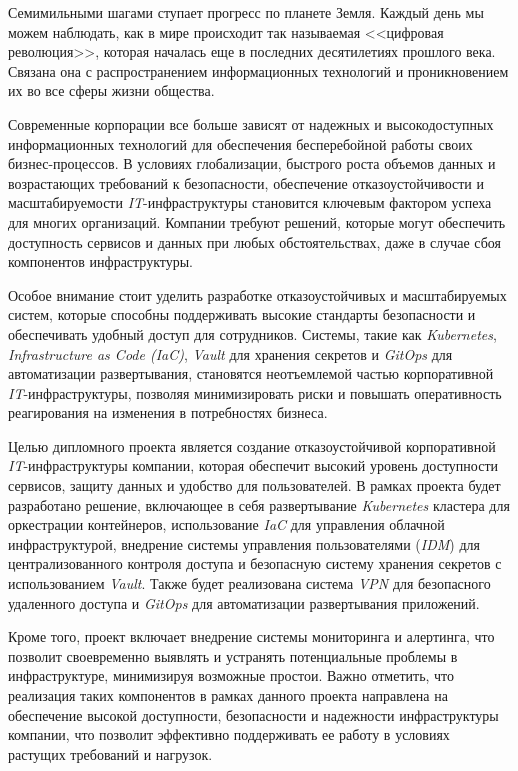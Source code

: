 \label{sec:intro}

Семимильными шагами ступает прогресс по планете Земля. Каждый день мы можем наблюдать, как в мире происходит так называемая <<цифровая революция>>, которая началась еще в последних десятилетиях прошлого века. Связана она с распространением информационных технологий и проникновением их во все сферы жизни общества.

Современные корпорации все больше зависят от надежных и высокодоступных информационных технологий для обеспечения бесперебойной работы своих бизнес-процессов. В условиях глобализации, быстрого роста объемов данных и возрастающих требований к безопасности, обеспечение отказоустойчивости и масштабируемости \textit{IT}-инфраструктуры становится ключевым фактором успеха для многих организаций. Компании требуют решений, которые могут обеспечить доступность сервисов и данных при любых обстоятельствах, даже в случае сбоя компонентов инфраструктуры.

Особое внимание стоит уделить разработке отказоустойчивых и масштабируемых систем, которые способны поддерживать высокие стандарты безопасности и обеспечивать удобный доступ для сотрудников. Системы, такие как \textit{Kubernetes}, \textit{Infrastructure as Code (IaC)}, \textit{Vault} для хранения секретов и \textit{GitOps} для автоматизации развертывания, становятся неотъемлемой частью корпоративной \textit{IT}-инфраструктуры, позволяя минимизировать риски и повышать оперативность реагирования на изменения в потребностях бизнеса.

Целью дипломного проекта является создание отказоустойчивой корпоративной \textit{IT}-инфраструктуры компании, которая обеспечит высокий уровень доступности сервисов, защиту данных и удобство для пользователей. В рамках проекта будет разработано решение, включающее в себя развертывание \textit{Kubernetes} кластера для оркестрации контейнеров, использование \textit{IaC} для управления облачной инфраструктурой, внедрение системы управления пользователями (\textit{IDM}) для централизованного контроля доступа и безопасную систему хранения секретов с использованием \textit{Vault}. Также будет реализована система \textit{VPN} для безопасного удаленного доступа и \textit{GitOps} для автоматизации развертывания приложений.

Кроме того, проект включает внедрение системы мониторинга и алертинга, что позволит своевременно выявлять и устранять потенциальные проблемы в инфраструктуре, минимизируя возможные простои. Важно отметить, что реализация таких компонентов в рамках данного проекта направлена на обеспечение высокой доступности, безопасности и надежности инфраструктуры компании, что позволит эффективно поддерживать ее работу в условиях растущих требований и нагрузок.

